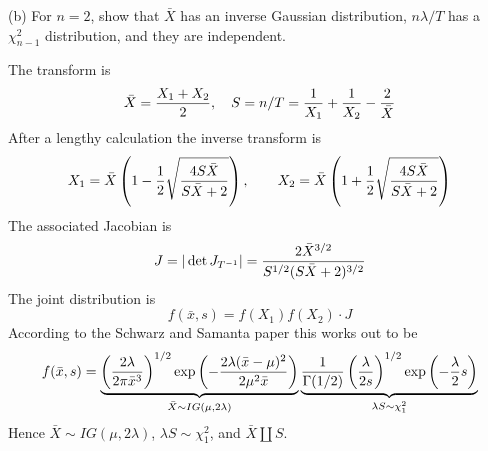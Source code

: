 \bigskip
\noindent
(b) For $n=2$, show that $\bar X$ has an inverse Gaussian
distribution, $n\lambda/T$ has a $\chi^2_{n-1}$ distribution,
and they are independent.


\bigskip
\noindent
The transform is
$$\bar X={X_1+X_2\over2},\quad
S=n/T={1\over X_1}+{1\over X_2}-{2\over\bar X}$$
After a lengthy calculation the inverse transform is
$$
X_1=\bar X\left(1-{1\over2}\sqrt{4S\bar X\over S\bar X+2}\right),
\qquad
X_2=\bar X\left(1+{1\over2}\sqrt{4S\bar X\over S\bar X+2}\right)
$$
The associated Jacobian is
$$J=|\det J_{T^{-1}}|={2\bar X^{3/2}\over S^{1/2}(S\bar X+2)^{3/2}}$$
The joint distribution is
$$f(\bar x,s)=f(X_1)f(X_2)\cdot J$$
According to the Schwarz and Samanta paper this works out to be
$$f(\bar x,s)=
\underbrace{
\left({2\lambda\over2\pi\bar x^3}\right)^{1/2}
\exp\left(-{2\lambda(\bar x-\mu)^2\over2\mu^2\bar x}\right)
}_{\bar X\sim IG(\mu,2\lambda)}
\underbrace{
{1\over\Gamma(1/2)}\left(\lambda\over2s\right)^{1/2}
\exp\left(-{\lambda\over2}s\right)
}_{\lambda S\sim\chi^2_1}
$$
Hence $\bar X\sim IG(\mu,2\lambda)$,
$\lambda S\sim\chi^2_1$, and $\bar X\amalg S$.

